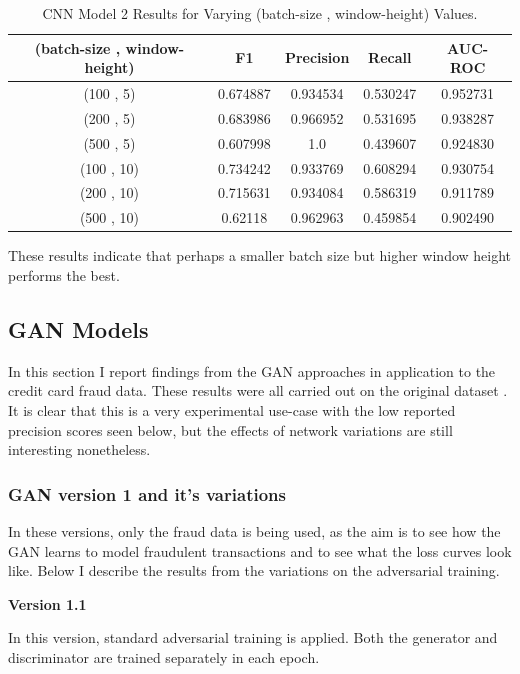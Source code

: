\documentclass[12pt,a4paper,twoside]{report}
\begin{document}
\begin{table}[H]  
  \centering
  \begin{tabular}{ccccc}
    \toprule
     (batch-size , window-height) & F1 & Precision & Recall & AUC-ROC \\ \midrule
    (100 , 5) & 0.674887 & 0.934534 & 0.530247 & 0.952731  \\
    (200 , 5) & 0.683986 & 0.966952 & 0.531695 & 0.938287 \\
    (500 , 5) & 0.607998 &1.0 & 0.439607 & 0.924830 \\
    (100 , 10) & 0.734242 & 0.933769 & 0.608294 & 0.930754 \\
    (200 , 10) & 0.715631 & 0.934084 & 0.586319 & 0.911789 \\
    (500 , 10) & 0.62118 & 0.962963 & 0.459854 & 0.902490\\
   \bottomrule
 \end{tabular}
 \caption{CNN Model 2 Results for Varying (batch-size , window-height) Values.}
\label{table:cnnv2-results-tuning}
\end{table}

These results indicate that perhaps a smaller batch size but higher window height performs the best. 

\subsection{GAN Models}
In this section I report findings from the GAN approaches in application to the credit card fraud data. These results were all carried out on the original dataset . It is clear that this is a very experimental use-case with the low reported precision scores seen below, but the effects of network variations are still interesting nonetheless.

\subsubsection{GAN version 1 and it's variations}

In these versions, only the fraud data is being used, as the aim is to see how the GAN learns to model fraudulent transactions and to see what the loss curves look like. Below I describe the results from the variations on the adversarial training. 

\textbf{Version 1.1}

In this version, standard adversarial training is applied. Both the generator and discriminator are trained separately in each epoch.
\end{document}
